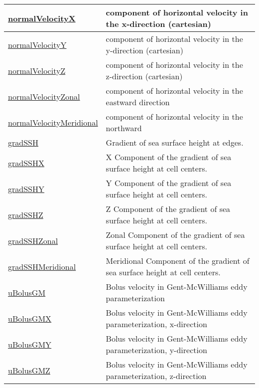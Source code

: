 {\begin{center}
\begin{longtable}{| p{2.0in} | p{4.0in} |}
	\hline
	\hyperref[subsec:var_sec_diagnostics_normalVelocityX]{normalVelocityX} & component of horizontal velocity in the x-direction (cartesian) \\
	\hline
	\hyperref[subsec:var_sec_diagnostics_normalVelocityY]{normalVelocityY} & component of horizontal velocity in the y-direction (cartesian) \\
	\hline
	\hyperref[subsec:var_sec_diagnostics_normalVelocityZ]{normalVelocityZ} & component of horizontal velocity in the z-direction (cartesian) \\
	\hline
	\hyperref[subsec:var_sec_diagnostics_normalVelocityZonal]{normalVelocityZonal} & component of horizontal velocity in the eastward direction \\
	\hline
	\hyperref[subsec:var_sec_diagnostics_normalVelocityMeridional]{normalVelocityMeridional} & component of horizontal velocity in the northward \\
	\hline
	\hyperref[subsec:var_sec_diagnostics_gradSSH]{gradSSH} & Gradient of sea surface height at edges. \\
	\hline
	\hyperref[subsec:var_sec_diagnostics_gradSSHX]{gradSSHX} & X Component of the gradient of sea surface height at cell centers. \\
	\hline
	\hyperref[subsec:var_sec_diagnostics_gradSSHY]{gradSSHY} & Y Component of the gradient of sea surface height at cell centers. \\
	\hline
	\hyperref[subsec:var_sec_diagnostics_gradSSHZ]{gradSSHZ} & Z Component of the gradient of sea surface height at cell centers. \\
	\hline
	\hyperref[subsec:var_sec_diagnostics_gradSSHZonal]{gradSSHZonal} & Zonal Component of the gradient of sea surface height at cell centers. \\
	\hline
	\hyperref[subsec:var_sec_diagnostics_gradSSHMeridional]{gradSSHMeridional} & Meridional Component of the gradient of sea surface height at cell centers. \\
	\hline
	\hyperref[subsec:var_sec_diagnostics_uBolusGM]{uBolusGM} & Bolus velocity in Gent-McWilliams eddy parameterization \\
	\hline
	\hyperref[subsec:var_sec_diagnostics_uBolusGMX]{uBolusGMX} & Bolus velocity in Gent-McWilliams eddy parameterization, x-direction \\
	\hline
	\hyperref[subsec:var_sec_diagnostics_uBolusGMY]{uBolusGMY} & Bolus velocity in Gent-McWilliams eddy parameterization, y-direction \\
	\hline
	\hyperref[subsec:var_sec_diagnostics_uBolusGMZ]{uBolusGMZ} & Bolus velocity in Gent-McWilliams eddy parameterization, z-direction \\

\end{longtable}
\end{center}}
